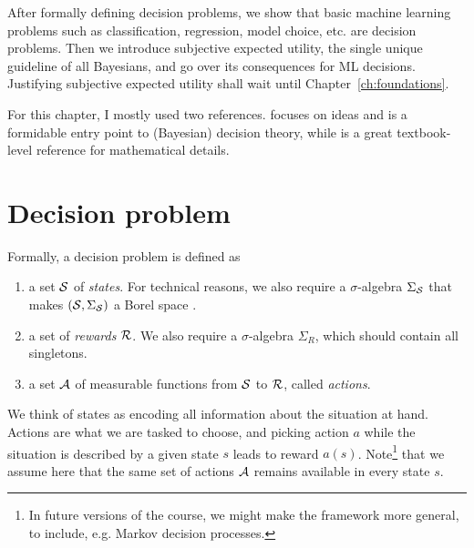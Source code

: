 After formally defining decision problems, we show that basic machine learning problems such as classification, regression, model choice, etc. are decision problems. 
Then we introduce subjective expected utility, the single unique guideline of all Bayesians, and go over its consequences for ML decisions.
Justifying subjective expected utility shall wait until Chapter~\ref{ch:foundations}.

For this chapter, I mostly used two references.
\citep{PaIn09} focuses on ideas and is a formidable entry point to (Bayesian) decision theory, while \citep{Sch11} is a great textbook-level reference for mathematical details.

\section{Decision problem}

Formally, a decision problem is defined as 
\begin{enumerate}
    \item a set $\mathcal{S}$ of \emph{states}. For technical reasons, we also require a $\sigma$-algebra $\Sigma_{\mathcal{S}}$ that makes $(\mathcal{S}, \Sigma_{\mathcal{S}})$ a Borel space \citep{Sch11}.
    \item a set of \emph{rewards} $\mathcal{R}$. We also require a $\sigma$-algebra $\Sigma_R$, which should contain all singletons. 
    \item a set $\mathcal{A}$ of measurable functions from $\mathcal{S}$ to $\mathcal{R}$, called \emph{actions}.
\end{enumerate}
We think of states as encoding all information about the situation at hand. Actions are what we are tasked to choose, and picking action $a$ while the situation is described by a given state $s$ leads to reward $a(s)$.
Note\footnote{In future versions of the course, we might make the framework more general, to include, e.g. Markov decision processes.} that we assume here that the same set of actions $\mathcal{A}$ remains available in every state $s$.